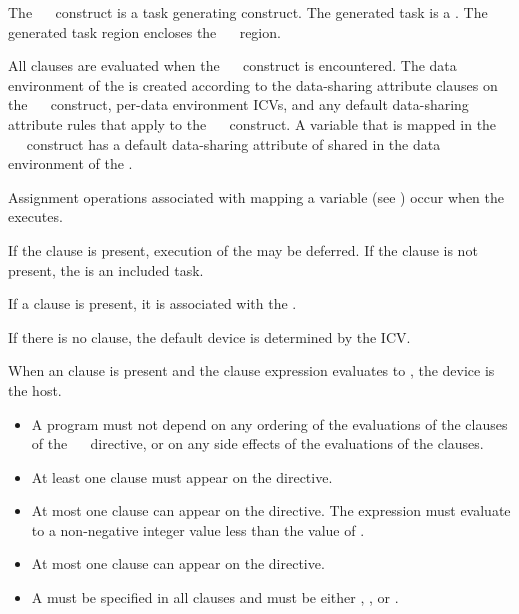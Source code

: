 The ~~ construct is a task generating construct.  The generated task is a .  The generated task region encloses the ~~ region.

All clauses are evaluated when the ~~ construct is encountered.  The data environment of the  is created according to the data-sharing attribute clauses on the ~~ construct, per-data environment ICVs, and any default data-sharing attribute rules that apply to the ~~ construct.  A variable that is mapped in the ~~ construct has a default data-sharing attribute of shared in the data environment of the .

Assignment operations associated with mapping a variable (see ) occur when the  executes.

If the  clause is present, execution of the  may be deferred.  If the  clause is not present, the  is an included task.

If a  clause is present, it is associated with the .

If there is no  clause, the default device is determined by the  ICV.

When an  clause is present and the  clause expression evaluates to , the device is the host. 
{}

\restrictions
\begin{itemize}
\item A program must not depend on any ordering of the evaluations of the clauses of the ~~ directive, or on any side effects of the evaluations of the clauses.
\item At least one  clause must appear on the directive.
\item At most one  clause can appear on the
  directive.  The  expression must evaluate to a
  non-negative integer value less than the value of
  .
\item At most one  clause can appear on the directive.
\item A  must be specified in all  clauses and must be either , , or .
\end{itemize}

